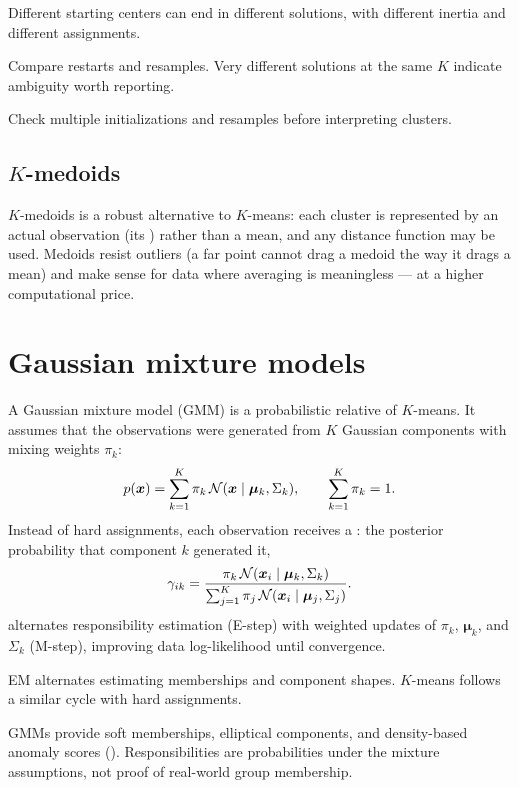 Different starting centers can end in different solutions, with different inertia and different assignments.

Compare restarts and resamples. Very different solutions at the same $K$ indicate ambiguity worth reporting.

\begin{keyidea}
Check multiple initializations and resamples before interpreting clusters.
\end{keyidea}

\subsection{$K$-medoids}

$K$-medoids is a robust alternative to $K$-means: each cluster is represented by an actual observation (its ) rather than a mean, and any distance function may be used. Medoids resist outliers (a far point cannot drag a medoid the way it drags a mean) and make sense for data where averaging is meaningless --- at a higher computational price.

\section{Gaussian mixture models}

A Gaussian mixture model (GMM) is a probabilistic relative of $K$-means. It assumes that the observations were generated from $K$ Gaussian components with mixing weights $\pi_k$:
\[
  p(\bm{x})
  =\sum_{k=1}^{K}
  \pi_k\,
  \mathcal{N}(\bm{x}\mathrel{|}\bm{\mu}_k,\Sigma_k),
  \qquad
  \sum_{k=1}^{K}\pi_k=1 .
\]
Instead of hard assignments, each observation receives a : the posterior probability that component $k$ generated it,
\[
  \gamma_{ik}
  =\frac{\pi_k\,\mathcal{N}(\bm{x}_i\mathrel{|}\bm{\mu}_k,\Sigma_k)}
        {\sum_{j=1}^{K}\pi_j\,\mathcal{N}(\bm{x}_i\mathrel{|}\bm{\mu}_j,\Sigma_j)} .
\]
 alternates responsibility estimation (E-step) with weighted updates of $\pi_k$, $\bm\mu_k$, and $\Sigma_k$ (M-step), improving data log-likelihood until convergence.

\begin{intuition}
EM alternates estimating memberships and component shapes. $K$-means follows a similar cycle with hard assignments.
\end{intuition}

GMMs provide soft memberships, elliptical components, and density-based anomaly scores (). Responsibilities are probabilities under the mixture assumptions, not proof of real-world group membership.

